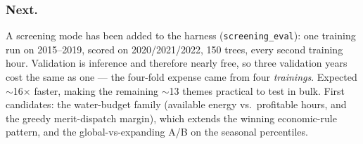 \subsubsection*{Next.} A screening mode has been added to the harness
(\texttt{screening\_eval}): one training run on 2015--2019, scored on 2020/2021/2022, 150 trees,
every second training hour. Validation is inference and therefore nearly free, so three
validation years cost the same as one --- the four-fold expense came from four \emph{trainings}.
Expected $\sim$16$\times$ faster, making the remaining $\sim$13 themes practical to test in bulk.
First candidates: the water-budget family (available energy vs.\ profitable hours, and the
greedy merit-dispatch margin), which extends the winning economic-rule pattern, and the
global-vs-expanding A/B on the seasonal percentiles.
